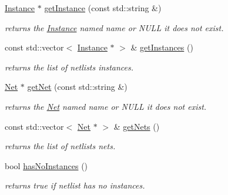 \begin{DoxyCompactItemize}
\hyperlink{class_open_chams_1_1_instance}{Instance} $\ast$ \hyperlink{class_open_chams_1_1_netlist_a6fbcd8c819bd0b576398ac031c2726fc}{get\+Instance} (const std\+::string \&)
\begin{DoxyCompactList}\small\item\em returns the \hyperlink{class_open_chams_1_1_instance}{Instance} named {\ttfamily name} or N\+U\+LL it does not exist. \end{DoxyCompactList}\item 
\mbox{\label{class_open_chams_1_1_netlist_a8e6e58ffab876152a740092520c35d73}} 
const std\+::vector$<$ \hyperlink{class_open_chams_1_1_instance}{Instance} $\ast$ $>$ \& \hyperlink{class_open_chams_1_1_netlist_a8e6e58ffab876152a740092520c35d73}{get\+Instances} ()
\begin{DoxyCompactList}\small\item\em returns the list of netlist\textquotesingle{}s instances. \end{DoxyCompactList}\item 
\hyperlink{class_open_chams_1_1_net}{Net} $\ast$ \hyperlink{class_open_chams_1_1_netlist_a18b468cdde5adf75e3057c8558972f52}{get\+Net} (const std\+::string \&)
\begin{DoxyCompactList}\small\item\em returns the \hyperlink{class_open_chams_1_1_net}{Net} named {\ttfamily name} or N\+U\+LL it does not exist. \end{DoxyCompactList}\item 
\mbox{\label{class_open_chams_1_1_netlist_abf36db82efb99a8ec8ae4b454be00019}} 
const std\+::vector$<$ \hyperlink{class_open_chams_1_1_net}{Net} $\ast$ $>$ \& \hyperlink{class_open_chams_1_1_netlist_abf36db82efb99a8ec8ae4b454be00019}{get\+Nets} ()
\begin{DoxyCompactList}\small\item\em returns the list of netlist\textquotesingle{}s nets. \end{DoxyCompactList}\item 
\mbox{\label{class_open_chams_1_1_netlist_adab62a25face462baec9a7fffb2b6158}} 
bool \hyperlink{class_open_chams_1_1_netlist_adab62a25face462baec9a7fffb2b6158}{has\+No\+Instances} ()
\begin{DoxyCompactList}\small\item\em returns true if netlist has no instances. \end{DoxyCompactList}\item 

\end{DoxyCompactItemize}
